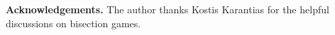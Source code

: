 
\noindent
\textbf{Acknowledgements.}
The author thanks Kostis Karantias for the helpful discussions on bisection games.
